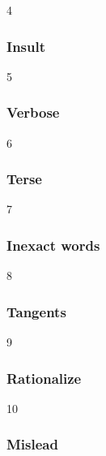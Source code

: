 4
\begin{frame}
\frametitle{Insult}
\end{frame}

5
\begin{frame}
\frametitle{Verbose}
\end{frame}

6
\begin{frame}
\frametitle{Terse}
\end{frame}

7
\begin{frame}
\frametitle{Inexact words}
\end{frame}

8
\begin{frame}
\frametitle{Tangents}
\end{frame}

9
\begin{frame}
\frametitle{Rationalize}
\end{frame}

10
\begin{frame}
\frametitle{Mislead}
\end{frame}




